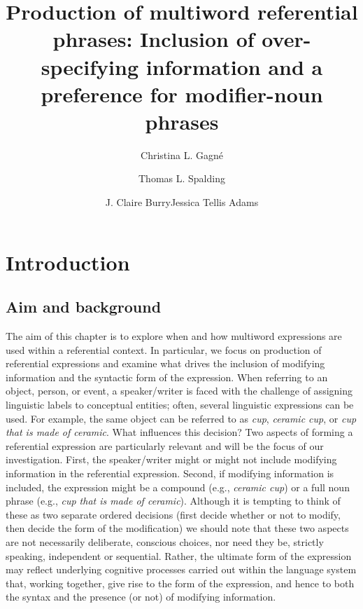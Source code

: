 \documentclass[output=paper]{langsci/langscibook}
\title{Production of multiword referential phrases: Inclusion of
  over-specifying information and a preference for modifier-noun
  phrases}
\author{Christina L. Gagné\affiliation{Department of Psychology, University of Alberta}\and  Thomas L. Spalding\affiliation{Department of Psychology, University of Alberta}\and  J. Claire Burry\affiliation{Department of Psychology, University of Alberta}\lastand  Jessica Tellis Adams\affiliation{KidsAbility Centre for Child Development, Ontario}}
\begin{document}
\maketitle


\section{Introduction}

\subsection{Aim and background}

The aim of this chapter is to explore when and how multiword
expressions are used within a referential context. In particular, we
focus on production of referential expressions and examine what drives
the inclusion of modifying information and the syntactic form of the
expression. When referring to an object, person, or event, a
speaker/writer is faced with the challenge of assigning linguistic
labels to conceptual entities; often, several linguistic expressions
can be used. For example, the same object can be referred to as \textit{cup},
\textit{ceramic cup}, or \textit{cup that is made of ceramic}. What influences this
decision? Two aspects of forming a referential expression are
particularly relevant and will be the focus of our
investigation. First, the speaker/writer might or might not include
modifying information in the referential expression. Second, if
modifying information is included, the expression might be a compound
(e.g., \textit{ceramic cup}) or a full noun phrase (e.g., \textit{cup that is made of
ceramic}). Although it is tempting to think of these as two separate
ordered decisions (first decide whether or not to modify, then decide
the form of the modification) we should note that these two aspects
are not necessarily deliberate, conscious choices, nor need they be,
strictly speaking, independent or sequential. Rather, the ultimate
form of the expression may reflect underlying cognitive processes
carried out within the language system that, working together, give
rise to the form of the expression, and hence to both the syntax and
the presence (or not) of modifying information.
\end{document}
